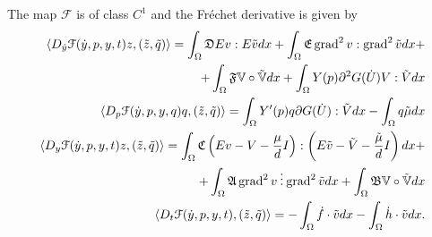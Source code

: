 \begin{prop}
\label{prop:F-regularity}
The map $\mathcal{F}$ is of class $C^1$ and the Fréchet derivative is given by
\begin{align*}
\begin{split}
\langle D_{\dot y}\mathcal{F}(\dot y,p,y,t)z,(\tilde z,\tilde q)\rangle=\int_\Omega\mathfrak{D}Ev:E\tilde vdx+\int_\Omega\mathfrak{E}\operatorname{grad}^2v:\operatorname{grad}^2\tilde vdx+\\
+\int_\Omega\mathfrak{F}\mathbb{V}\circ\tilde{\mathbb{V}}dx+\int_\Omega Y(p)\partial^2 G(\dot U)V:\tilde Vdx
\end{split}& \\
\begin{split}
\langle D_p\mathcal{F}(\dot y,p,y,q)q,(\tilde z,\tilde q)\rangle=\int_\Omega Y'(p)q\partial G(\dot U):\tilde Vdx-\int_\Omega q\tilde\mu dx
\end{split}& \\
\begin{split}
\langle D_y\mathcal{F}(\dot y,p,y,t)z,(\tilde z,\tilde q)\rangle=\int_\Omega\mathfrak{C}\left(Ev-V-\frac{\mu}{d}I\right):\left(E\tilde v-\tilde V-\frac{\tilde\mu}{d}I\right)dx+\\
+\int_\Omega\mathfrak{A}\operatorname{grad}^2v\mathbin{\vdots}\operatorname{grad}^2\tilde vdx+\int_\Omega\mathfrak{B}\mathbb{V}\circ\tilde{\mathbb{V}}dx
\end{split} & \\
\begin{split}
\langle D_t\mathcal{F}(\dot y,p,y,t),(\tilde z,\tilde q)\rangle=-\int_\Omega\dot f\cdot\tilde vdx-\int_\Omega\dot h\cdot\tilde vdx.
\end{split}
\end{align*}
\end{prop}
